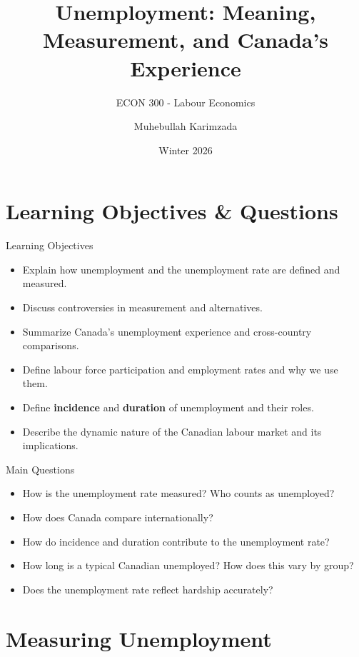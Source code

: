 \documentclass[aspectratio=169]{beamer}
\title{\textbf{Unemployment: Meaning, Measurement, and Canada's Experience \vspace{.5cm}\\  }}
\subtitle{ {\large ECON 300 - Labour Economics}}
\author{Muhebullah Karimzada}
\date{Winter 2026}
\begin{document}
\begin{frame}[plain]
  \titlepage
\end{frame}

\section{Learning Objectives \& Questions}

\begin{frame}{Learning Objectives}
\transfade
\begin{itemize}[<+->]
  \item Explain how unemployment and the unemployment rate are defined and measured.
  \item Discuss controversies in measurement and alternatives.
  \item Summarize Canada’s unemployment experience and cross-country comparisons.
  \item Define labour force participation and employment rates and why we use them.
  \item Define \textbf{incidence} and \textbf{duration} of unemployment and their roles.
  \item Describe the dynamic nature of the Canadian labour market and its implications.
\end{itemize}
\end{frame}

\begin{frame}{Main Questions}
\transfade
\begin{itemize}[<+->]
  \item How is the unemployment rate measured? Who counts as unemployed?
  \item How does Canada compare internationally?
  \item How do incidence and duration contribute to the unemployment rate?
  \item How long is a typical Canadian unemployed? How does this vary by group?
  \item Does the unemployment rate reflect hardship accurately?
\end{itemize}
\end{frame}

\section{Measuring Unemployment}
\end{document}
